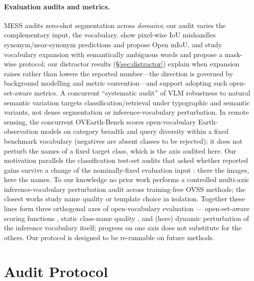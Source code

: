 \documentclass[11pt]{article}
\begin{document}
\paragraph{Evaluation audits and metrics.} MESS \citep{blumenstiel2023mess} audits
zero-shot segmentation across \emph{domains}; our audit varies the complementary input,
the vocabulary. \citet{zhou2023rethinking} show pixel-wise IoU mishandles
synonym/near-synonym predictions and propose Open mIoU, and \citet{huang2025revisit}
study vocabulary expansion with semantically ambiguous words and propose a mask-wise
protocol; our distractor results (\S\ref{sec:distractor}) explain when expansion
raises rather than lowers the reported number---the direction is governed by
background modelling and metric convention---and support adopting such open-set-aware
metrics. A concurrent ``systematic audit'' of VLM robustness to natural
semantic variation \citep{beyondbench2026} targets classification/retrieval
under typographic and semantic variants, not dense segmentation or
inference-vocabulary perturbation. In remote sensing, the concurrent
OVEarth-Bench \citep{li2026ovearthbench} scores open-vocabulary Earth-observation
models on category breadth and query diversity within a fixed benchmark
vocabulary (negatives are absent classes to be rejected); it does not perturb
the names of a fixed target class, which is the axis audited here. Our motivation
parallels the classification test-set audits that asked whether reported gains
survive a change of the nominally-fixed evaluation input
\citep{recht2019imagenetv2,beyer2020imagenet}: there the images, here the names. To our knowledge no prior work performs a controlled multi-axis
inference-vocabulary perturbation audit across training-free OVSS methods; the closest
works study name quality \citep{huang2024renovating} or template choice
\citep{benigmim2025floss} in isolation. Together these lines form three
orthogonal axes of open-vocabulary evaluation --- open-set-aware scoring
functions \citep{zhou2023rethinking}, static class-name quality
\citep{huang2024renovating}, and (here) dynamic perturbation of the
inference vocabulary itself; progress on one axis does not substitute for the
others. Our protocol is designed to be re-runnable on
future methods.

\section{Audit Protocol}
\label{sec:protocol}
\end{document}
